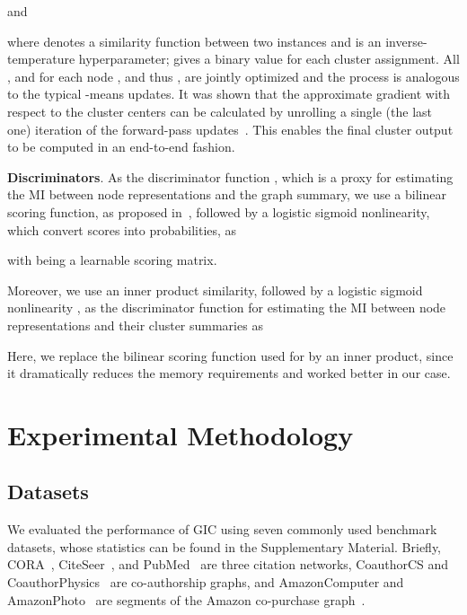 \documentclass{article}
\begin{document}
and

where  denotes a similarity function between two instances and  is an inverse-temperature hyperparameter;  gives a binary value for each cluster assignment. All , and  for each node  , and thus , are jointly optimized and the process is analogous to the typical -means updates. It was shown that the approximate gradient with respect to the cluster centers can be calculated by unrolling a single (the last one) iteration of the forward-pass updates~\cite{wilder2019end}. This enables the final cluster output to be computed in an end-to-end fashion.

\noindent
\textbf{Discriminators}.
As the discriminator function , which is a proxy for estimating the MI between node representations and the graph summary, we use a bilinear scoring function, as proposed in~\cite{velickovic2018deep}, followed by a logistic sigmoid nonlinearity, which convert scores into probabilities, as

with  being a learnable scoring matrix.

Moreover, we use an inner product similarity, followed by a logistic sigmoid nonlinearity , as the discriminator function  for estimating the MI between node representations and their cluster summaries as

Here, we replace the bilinear scoring function used for  by an inner product, since it dramatically reduces the memory requirements and worked better in our case. 




\section{Experimental Methodology} \label{secexps}
\subsection{Datasets}
We evaluated the performance of GIC using seven commonly used benchmark datasets, whose statistics can be found in the Supplementary Material. Briefly, CORA~\cite{Mccallum00automatingthe}, CiteSeer~\cite{Giles98CiteSeeran}, and PubMed~\cite{namata2012query} are three citation networks, CoauthorCS and CoauthorPhysics~\cite{shchur2018pitfalls} are co-authorship graphs, and AmazonComputer and AmazonPhoto~\cite{shchur2018pitfalls} are segments of the Amazon co-purchase graph~\cite{mcauley2015image}.
\end{document}
